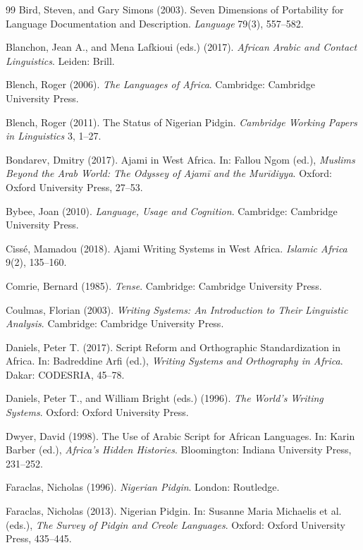 \documentclass[12pt]{article}
\begin{document}
\begin{thebibliography}{99}
Bird, Steven, and Gary Simons (2003).
Seven Dimensions of Portability for Language Documentation and Description.
\textit{Language} 79(3), 557--582.

Blanchon, Jean A., and Mena Lafkioui (eds.) (2017).
\textit{African Arabic and Contact Linguistics}.
Leiden: Brill.

Blench, Roger (2006).
\textit{The Languages of Africa}.
Cambridge: Cambridge University Press.

Blench, Roger (2011).
The Status of Nigerian Pidgin.
\textit{Cambridge Working Papers in Linguistics} 3, 1--27.

Bondarev, Dmitry (2017).
Ajami in West Africa.
In: Fallou Ngom (ed.),
\textit{Muslims Beyond the Arab World: The Odyssey of \textit{Ajam\={i}} and the Mur\={i}diyya}.
Oxford: Oxford University Press, 27--53.

Bybee, Joan (2010).
\textit{Language, Usage and Cognition}.
Cambridge: Cambridge University Press.

Cissé, Mamadou (2018).
Ajami Writing Systems in West Africa.
\textit{Islamic Africa} 9(2), 135--160.

Comrie, Bernard (1985).
\textit{Tense}.
Cambridge: Cambridge University Press.

Coulmas, Florian (2003).
\textit{Writing Systems: An Introduction to Their Linguistic Analysis}.
Cambridge: Cambridge University Press.

Daniels, Peter T. (2017).
Script Reform and Orthographic Standardization in Africa.
In: Badreddine Arfi (ed.),
\textit{Writing Systems and Orthography in Africa}.
Dakar: CODESRIA, 45--78.

Daniels, Peter T., and William Bright (eds.) (1996).
\textit{The World's Writing Systems}.
Oxford: Oxford University Press.

Dwyer, David (1998).
The Use of Arabic Script for African Languages.
In: Karin Barber (ed.),
\textit{Africa's Hidden Histories}.
Bloomington: Indiana University Press, 231--252.

Faraclas, Nicholas (1996).
\textit{Nigerian Pidgin}.
London: Routledge.

Faraclas, Nicholas (2013).
Nigerian Pidgin.
In: Susanne Maria Michaelis et al. (eds.),
\textit{The Survey of Pidgin and Creole Languages}.
Oxford: Oxford University Press, 435--445.


\end{thebibliography}
\end{document}
